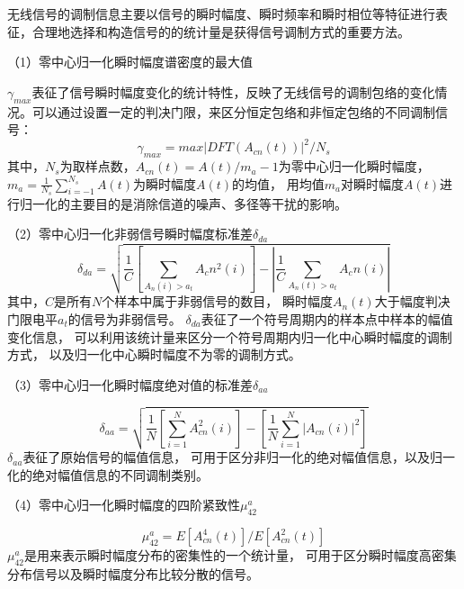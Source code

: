 无线信号的调制信息主要以信号的瞬时幅度、瞬时频率和瞬时相位等特征进行表征，合理地选择和构造信号的的统计量是获得信号调制方式的重要方法\cite{杨杰2014通信信号调制识别}。\par

（1）零中心归一化瞬时幅度谱密度的最大值\par
$\gamma_{max}$表征了信号瞬时幅度变化的统计特性，反映了无线信号的调制包络的变化情况。可以通过设置一定的判决门限，来区分恒定包络和非恒定包络的不同调制信号：
\begin{equation}
\label{eqt_4_2}
\gamma_{max}=max|DFT(A_{cn}(t))|^{2}/N_s
\end{equation}
其中，$N_s$为取样点数，$A_{cn}(t)=A(t)/m_a-1$为零中心归一化瞬时幅度，
$m_a=\frac{1}{N_s}\sum_{i=-1}^{N_s}A(t)$为瞬时幅度$A(t)$的均值，
用均值$m_a$对瞬时幅度$A(t)$进行归一化的主要目的是消除信道的噪声、多径等干扰的影响。\par

（2）零中心归一化非弱信号瞬时幅度标准差$\delta_{da}$
\begin{equation}
\label{eqt_4_3}
\delta_{da}=\sqrt{\frac{1}{C}\left[\sum_{A_n(i)>a_t} A_cn^2(i)\right]
	- \left|\frac{1}{C} \sum_{A_n(t)>a_t} A_cn(i)\right|}
\end{equation}
其中，$C$是所有$N$个样本中属于非弱信号的数目，
瞬时幅度$A_n(t)$大于幅度判决门限电平$a_t$的信号为非弱信号。
$\delta_{da}$表征了一个符号周期内的样本点中样本的幅值变化信息，
可以利用该统计量来区分一个符号周期内归一化中心瞬时幅度的调制方式，
以及归一化中心瞬时幅度不为零的调制方式。\par

（3）零中心归一化瞬时幅度绝对值的标准差$\delta_{aa}$\par
\begin{equation}
\label{eqt_4_4}
\delta_{aa} = \sqrt{\frac{1}{N}\left[\sum_{i=1}^{N} A_{cn}^2(i)\right]
	- \left[\frac{1}{N} \sum_{i=1}^{N} \left|A_{cn}(i)\right|^2\right]}
\end{equation}
$\delta_{aa}$表征了原始信号的幅值信息，
可用于区分非归一化的绝对幅值信息，以及归一化的绝对幅值信息的不同调制类别。\par

（4）零中心归一化瞬时幅度的四阶紧致性$\mu_{42}^{a}$\par
\begin{equation}
\label{eqt_4_5}
\mu_{42}^{a} = E\left[A_{cn}^{4} (t) \right] / E\left[A_{cn}^{2} (t) \right]
\end{equation}
$\mu_{42}^{a}$是用来表示瞬时幅度分布的密集性的一个统计量，
可用于区分瞬时幅度高密集分布信号以及瞬时幅度分布比较分散的信号。

